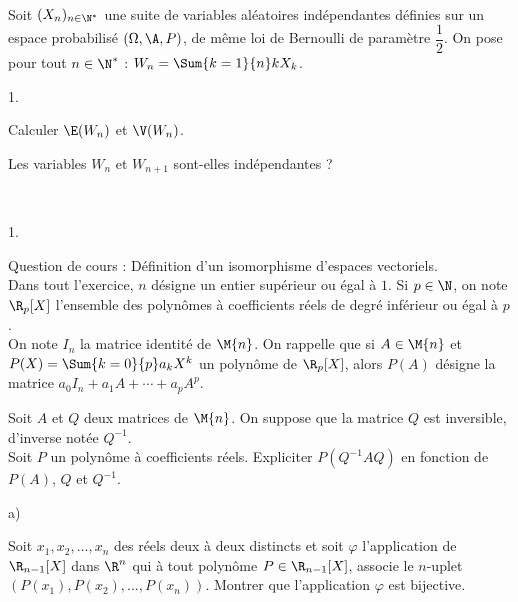 \documentclass[11pt]{article}%
\begin{document}
\begin{exerciceSP}~\\
  Soit $(X_n)_{n\in\N^*}$ une suite de variables aléatoires
  indépendantes définies sur un espace probabilisé $(\Omega,\A,P)$, de
  même loi de Bernoulli de paramètre $\dfrac{1}{2}$. On pose pour tout
  $n\in\N^*$ : $W_n=\Sum{k=1}{n} k X_k$.
  \begin{noliste}{1.}
    \setlength{\itemsep}{2mm}
  \item Calculer $\E(W_n)$ et $\V(W_n)$.
  \item Les variables $W_n$ et $W_{n+1}$ sont-elles indépendantes ?
  \end{noliste}
\end{exerciceSP}


\newpage


\begin{exerciceAP}~
  \begin{noliste}{1.}
    \setlength{\itemsep}{2mm}
  \item Question de cours : Définition d'un isomorphisme d'espaces vectoriels.\\
    Dans tout l'exercice, $n$ désigne un entier supérieur ou égal à
    $1$. Si $p\in\N$, on note $\R_p[X]$ l'ensemble des polynômes à
    coefficients réels de degré inférieur ou égal à $p$.\\
    On note $I_n$ la matrice identité de $\M{n}$. On rappelle que si
    $A\in\M{n}$ et $P(X) = \Sum{k=0}{p} a_kX^k$ un polynôme de
    $\R_p[X]$, alors $P(A)$ désigne la matrice $a_0 I_n+a_1 A+\cdots +
    a_p A^p$.

  \item Soit $A$ et $Q$ deux matrices de $\M{n}$. On suppose que la
    matrice $Q$ est inversible, d'inverse notée $Q^{-1}$.\\
    Soit $P$ un polynôme à coefficients réels. Expliciter
    $P(Q^{-1}AQ)$ en fonction de $P(A)$, $Q$ et $Q^{-1}$.

  \item 
    \begin{noliste}{a)}
    \setlength{\itemsep}{2mm}
    \item Soit $x_1,x_2,\hdots,x_n$ des réels deux à deux distincts et
      soit $\varphi$ l'application de $\R_{n-1}[X]$ dans $\R^n$ qui à
      tout polynôme $P\in\R_{n-1}[X]$, associe le $n$-uplet
      $\left(P(x_1), P(x_2), \hdots, P(x_n)\right)$. Montrer que
      l'application $\varphi$ est bijective.


\end{noliste}
\end{noliste}
\end{exerciceAP}
\end{document}

